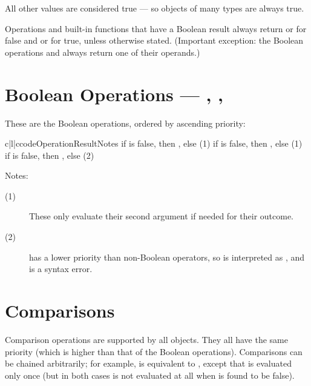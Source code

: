 All other values are considered true --- so objects of many types are
always true.

Operations and built-in functions that have a Boolean result always
return  or  for false and  or 
for true, unless otherwise stated.  (Important exception: the Boolean
operations  and  always
return one of their operands.)

\section{Boolean Operations ---
	    , , 
	    \label{boolean}}

These are the Boolean operations, ordered by ascending priority:

\begin{tableiii}{c|l|c}{code}{Operation}{Result}{Notes}
          {if  is false, then , else }{(1)}
          {if  is false, then , else }{(1)}
  \hline
          {if  is false, then , else }{(2)}
\end{tableiii}

\noindent
Notes:

\begin{description}

\item[(1)]
These only evaluate their second argument if needed for their outcome.

\item[(2)]
 has a lower priority than non-Boolean operators, so
 is interpreted as , and  is a syntax error.

\end{description}


\section{Comparisons \label{comparisons}}

Comparison operations are supported by all objects.  They all have the
same priority (which is higher than that of the Boolean operations).
Comparisons can be chained arbitrarily; for example,  is equivalent to , except that  is evaluated only once (but
in both cases  is not evaluated at all when  is found to be false).

